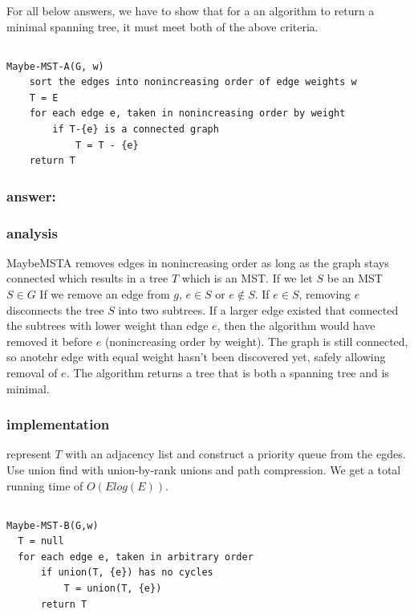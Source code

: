 \documentclass[titlepage]{article}
\theoremstyle{definition}
\begin{document}
For all below answers, we have to show that for a an algorithm to return a
minimal spanning tree, it must meet both of the above criteria.

\subsection{}
\begin{lstlisting}
Maybe-MST-A(G, w)
	sort the edges into nonincreasing order of edge weights w
	T = E
	for each edge e, taken in nonincreasing order by weight
		if T-{e} is a connected graph
			T = T - {e}
	return T
\end{lstlisting}
\subsubsection{answer: }
    \subsubsection{analysis}
      MaybeMSTA removes edges in nonincreasing order as long as the graph stays
      connected which results in a tree $T$ which is an MST. If we let $S$ be an
      MST $S \in G$  If we remove an edge from $g$, $e \in S$ or $e \notin S$. If
      $e \in S$, removing $e$ disconnects the tree $S$ into two subtrees. If a
      larger edge existed that connected the subtrees with lower weight than edge
      $e$, then the algorithm would have removed it before $e$ (nonincreasing order
      by weight). The graph is still connected, so anotehr edge with equal weight
      hasn't been discovered yet, safely allowing removal of $e$. 
      The algorithm returns a tree that is both a spanning tree and is minimal.
    \subsubsection{implementation}
      represent $T$ with an adjacency list and construct a priority queue from
      the egdes. Use union find with union-by-rank unions and path compression.
      We get a total running time of $O\left(E log(E)\right)$.


\subsection{}
\begin{lstlisting}
Maybe-MST-B(G,w)
  T = null
  for each edge e, taken in arbitrary order
	  if union(T, {e}) has no cycles
		  T = union(T, {e})
	  return T
\end{lstlisting}
\end{document}

